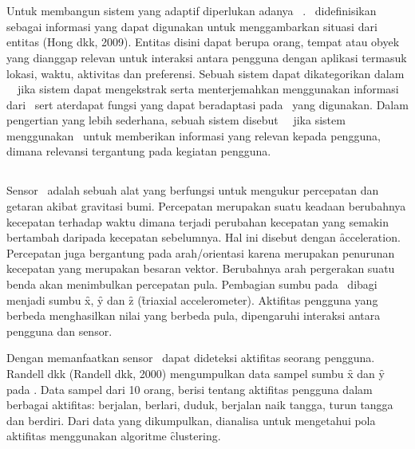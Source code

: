 
\section{\Context~\Aware}

Untuk membangun sistem yang adaptif diperlukan adanya \context~\aware.
\Context~didefinisikan sebagai informasi yang dapat digunakan untuk
menggambarkan situasi dari entitas (Hong dkk, 2009). Entitas disini dapat
berupa orang, tempat atau obyek yang dianggap relevan untuk interaksi antara
pengguna dengan aplikasi termasuk lokasi, waktu, aktivitas dan preferensi.
Sebuah sistem dapat dikategorikan dalam \context~\aware~jika sistem dapat
mengekstrak serta menterjemahkan menggunakan informasi dari \context~sert
aterdapat fungsi yang dapat beradaptasi pada \context~yang digunakan. Dalam
pengertian yang lebih sederhana, sebuah sistem disebut \context~\aware~jika
sistem menggunakan \context~untuk memberikan informasi yang relevan kepada
pengguna, dimana relevansi tergantung pada kegiatan pengguna.

\subsection{\Acc}

Sensor \acc~adalah sebuah alat yang berfungsi untuk mengukur percepatan dan
getaran akibat gravitasi bumi. Percepatan merupakan suatu keadaan berubahnya
kecepatan terhadap waktu dimana terjadi perubahan kecepatan yang semakin
bertambah daripada kecepatan sebelumnya.  Hal ini disebut dengan
\f{acceleration}. Percepatan juga bergantung pada arah/orientasi karena
merupakan penurunan kecepatan yang merupakan besaran vektor. Berubahnya arah
pergerakan suatu benda akan menimbulkan percepatan pula. Pembagian sumbu pada
\acc~dibagi menjadi sumbu \f{x}, \f{y} dan \f{z} (\f{triaxial accelerometer}).
Aktifitas pengguna yang berbeda menghasilkan nilai yang berbeda pula,
dipengaruhi interaksi antara pengguna dan sensor.

Dengan memanfaatkan sensor \acc~dapat dideteksi aktifitas seorang pengguna.
Randell dkk (Randell dkk, 2000) mengumpulkan data sampel sumbu \f{x} dan \f{y}
pada \acc. Data sampel dari 10 orang, berisi tentang aktifitas pengguna dalam
berbagai aktifitas: berjalan, berlari, duduk, berjalan naik tangga, turun
tangga dan berdiri. Dari data yang dikumpulkan, dianalisa untuk mengetahui pola
aktifitas menggunakan algoritme \f{clustering}.

